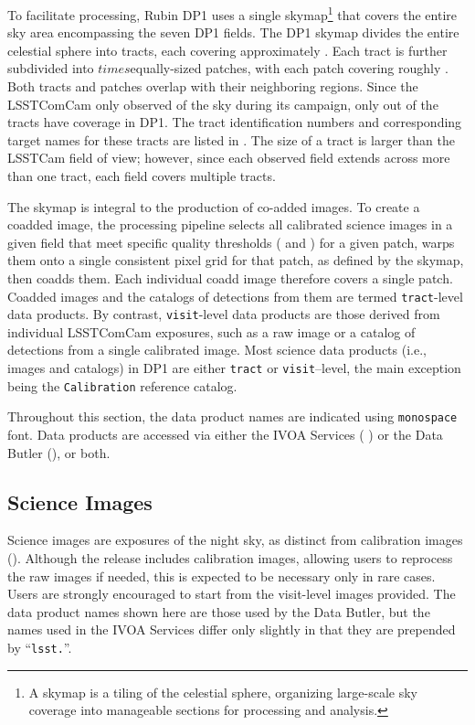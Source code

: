 To facilitate processing, Rubin \gls{DP1} uses a single skymap\footnote{A skymap is a tiling of the celestial sphere, organizing large-scale sky coverage into manageable sections for processing and analysis.} that covers the entire sky area encompassing the seven \gls{DP1} fields.
The \gls{DP1} skymap divides the entire celestial sphere into \ntotaltracts \gls{tract}s, each covering approximately \tractarea.
Each \gls{tract} is further subdivided into \npatchx$times$\npatchy equally-sized patches, with each \gls{patch} covering roughly \innerpatcharea.
Both tracts and patches overlap with their neighboring regions.
Since the \gls{LSSTComCam} only observed \totalarea of the sky during its campaign, only \ncoveredtracts out of the \ntotaltracts tracts have coverage in \gls{DP1}.
The tract identification numbers and corresponding target names for these tracts are listed in .
The size of a tract is larger than the LSSTCam field of view; however, since each observed field extends across more than one tract, each field covers multiple tracts.


The skymap is integral to the production of co-added images.
To create a coadded image, the processing pipeline selects all calibrated science images in a given field that meet specific quality thresholds ( and ) for a given \gls{patch}, warps them onto a single consistent pixel grid for that \gls{patch}, as defined by the skymap, then coadds them.
Each individual coadd image therefore covers a single \gls{patch}.
Coadded images and the catalogs of detections from them are termed \texttt{tract}-level data products.
By contrast, \texttt{visit}-level data products are those derived from individual \gls{LSSTComCam} exposures, such as a raw image or a catalog of detections from a single calibrated image.
Most science data products (i.e., images and catalogs) in \gls{DP1} are either \texttt{tract} or \texttt{visit}--level, the main exception being the \texttt{Calibration} reference catalog.

Throughout this section, the data product names are indicated using \texttt{monospace} font.
Data products are accessed via either the \gls{IVOA} Services ( ) or the Data \gls{Butler} (), or both.

\subsection{Science Images}
\label{ssec:science_images}
Science images are exposures of the night sky, as distinct from \gls{calibration} images ().
Although the release includes \gls{calibration} images, allowing users to reprocess the raw images if needed, this is expected to be necessary only in rare cases.
Users are strongly encouraged to start from the visit-level images provided.
The data product names shown here are those used by the Data \gls{Butler}, but the names used in the \gls{IVOA} Services differ only slightly in that they are prepended by ``\texttt{lsst.}''.

